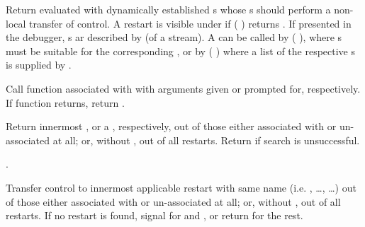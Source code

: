 \begin{LIST}{1cm}
  {
    Return  evaluated with dynamically
    established s whose s should
    perform a non-local transfer of control.  A restart is visible
    under  if ( )
    returns \T.  If presented in the debugger, s ar
    described by  (of a stream).  A
     can be called by ( 
    ), where s must be suitable for the
    corresponding , or by
    ( ) where a list of
    the respective s is supplied by .
  }

  {
    Call function associated with  with arguments given
    or prompted for, respectively. If  function returns,
    return .
  }

  {
    Return innermost  , or a , respectively, out of those either associated with
     or un-associated at all; or, without
    , out of all restarts. Return \retval{\NIL} if
    search is unsuccessful.
  }

  {
  .
  }

  {
  Transfer control to innermost applicable restart with same name
  (i.e. , \ldots,  \ldots) out of those either associated
  with  or un-associated at all; or, without
  , out of all restarts. If no restart is found,
  signal  for  and ,
  or return \retval{\NIL} for the rest.
  }


\end{LIST}
